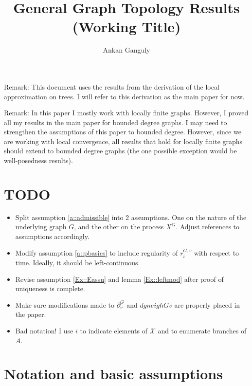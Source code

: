 \documentclass[12pt]{article}
\newcommand{\skipLine}{\vspace{12pt}}
\newcommand{\mc}{\mathcal}
\newcommand{\sta}{\mc{X}}							%
\newcommand{\gneigh}[2]{\partial^{#1}_{#2}}			%
\newcommand{\Xf}{X}									%
\newcommand{\rate}{r}								%
\newcommand{\gind}[1]{^{#1}}						%
\newcommand{\stpara}[1]{_{#1}}						%
\newcommand{\gvpara}[2]{^{#1,#2}}					%
\begin{document}
\title{General Graph Topology Results (Working Title)}
\author{Ankan Ganguly}

\maketitle

Remark: This document uses the results from the derivation of the local approximation on trees. I will refer to this derivation as the main paper for now.

\skipLine

Remark: In this paper I mostly work with locally finite graphs. However, I proved all my results in the main paper for bounded degree graphs. I may need to strengthen the assumptions of this paper to bounded degree. However, since we are working with local convergence, all results that hold for locally finite graphs should extend to bounded degree graphs (the one possible exception would be well-posedness results).

\section{TODO}

\begin{itemize}
\item Split assumption \ref{a::admissible} into 2 assumptions. One on the nature of the underlying graph \(G\), and the other on the process \(\Xf\gind{G}\). Adjust references to assumptions accordingly.

\item Modify assumption \ref{a::pbasics} to include regularity of \(\rate\gvpara{G}{v}\stpara{i}\) with respect to time. Ideally, it should be left-continuous.

\item Revise assumption \ref{Ex::Eassu} and lemma \ref{Ex::leftmod} after proof of uniqueness is complete.

\item Make sure modifications made to \(\gneigh{G}{v}\) and \(dgneigh{G}{v}\) are properly placed in the paper.

\item Bad notation! I use \(i\) to indicate elements of \(\sta\) and to enumerate branches of \(A\).
\end{itemize}


\section{Notation and basic assumptions}
\label{not}
\end{document}
